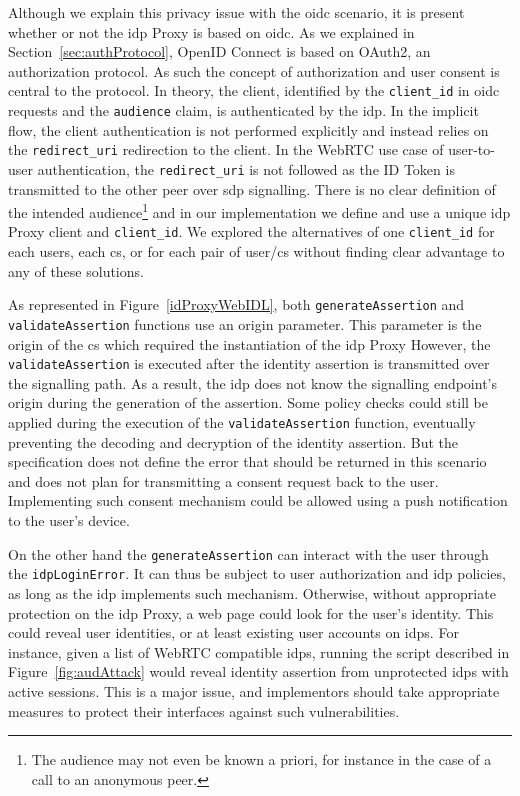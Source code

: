 Although we explain this privacy issue with the \gls{oidc} scenario, it is present whether or not the \gls{idp} Proxy is based on \gls{oidc}.
As we explained in Section~\ref{sec:authProtocol}, OpenID Connect is based on OAuth2, an authorization protocol.
As such the concept of authorization and user consent is central to the protocol.
In theory, the client, identified by the \texttt{client\_id} in \gls{oidc} requests and the \texttt{audience} claim, is authenticated by the \gls{idp}.
In the implicit flow, the client authentication is not performed explicitly and instead relies on the \texttt{redirect\_uri} redirection to the client.
In the WebRTC use case of user-to-user authentication, the \texttt{redirect\_uri} is not followed as the ID Token is transmitted to the other peer over \gls{sdp} signalling.
There is no clear definition of the intended audience\footnote{The audience may not even be known a priori, for instance in the case of a call to an anonymous peer.} and in our implementation we define and use a unique \gls{idp} Proxy client and \texttt{client\_id}.
We explored the alternatives of one \texttt{client\_id} for each users, each \gls{cs}, or for each pair of user/\gls{cs} without finding clear advantage to any of these solutions.

As represented in Figure~\ref{idProxyWebIDL}, both \texttt{generateAssertion} and \texttt{validateAssertion} functions use an origin parameter.
This parameter is the origin of the \gls{cs} which required the instantiation of the \gls{idp} Proxy
However, the \texttt{validateAssertion} is executed after the identity assertion is transmitted over the signalling path.
As a result, the \gls{idp} does not know the signalling endpoint's origin during the generation of the assertion.
Some policy checks could still be applied during the execution of the \texttt{validateAssertion} function, eventually preventing the decoding and decryption of the identity assertion.
But the specification does not define the error that should be returned in this scenario and does not plan for transmitting a consent request back to the user.
Implementing such consent mechanism could be allowed using a push notification to the user's device.

On the other hand the \texttt{generateAssertion} can interact with the user through the \texttt{\gls{idp}LoginError}.
It can thus be subject to user authorization and \gls{idp} policies, as long as the \gls{idp} implements such mechanism.
Otherwise, without appropriate protection on the \gls{idp} Proxy, a web page could look for the user's identity.
This could reveal user identities, or at least existing user accounts on \gls{idp}s.
For instance, given a list of WebRTC compatible \gls{idp}s, running the script described in Figure~\ref{fig:audAttack} would reveal identity assertion from unprotected \gls{idp}s with active sessions.
This is a major issue, and implementors should take appropriate measures to protect their interfaces against such vulnerabilities.

